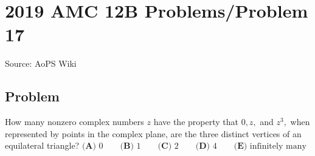 \documentclass[12pt]{article}
\begin{document}
\section*{{2019 AMC 12B Problems/Problem 17}}
Source: AoPS Wiki

\subsection*{Problem}
How many nonzero complex numbers $z$ have the property that $0, z,$ and $z^3,$ when represented by points in the complex plane, are the three distinct vertices of an equilateral triangle? $\textbf{(A) }0\qquad\textbf{(B) }1\qquad\textbf{(C) }2\qquad\textbf{(D) }4\qquad\textbf{(E) }\text{infinitely many}$
\end{document}
